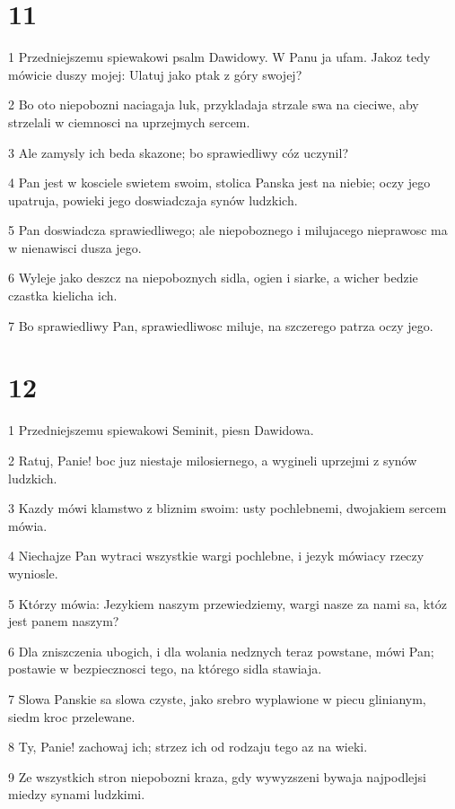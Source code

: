 \chapter{11}

\par 1 Przedniejszemu spiewakowi psalm Dawidowy. W Panu ja ufam. Jakoz tedy mówicie duszy mojej: Ulatuj jako ptak z góry swojej?
\par 2 Bo oto niepobozni naciagaja luk, przykladaja strzale swa na cieciwe, aby strzelali w ciemnosci na uprzejmych sercem.
\par 3 Ale zamysly ich beda skazone; bo sprawiedliwy cóz uczynil?
\par 4 Pan jest w kosciele swietem swoim, stolica Panska jest na niebie; oczy jego upatruja, powieki jego doswiadczaja synów ludzkich.
\par 5 Pan doswiadcza sprawiedliwego; ale niepoboznego i milujacego nieprawosc ma w nienawisci dusza jego.
\par 6 Wyleje jako deszcz na niepoboznych sidla, ogien i siarke, a wicher bedzie czastka kielicha ich.
\par 7 Bo sprawiedliwy Pan, sprawiedliwosc miluje, na szczerego patrza oczy jego.

\chapter{12}

\par 1 Przedniejszemu spiewakowi Seminit, piesn Dawidowa.
\par 2 Ratuj, Panie! boc juz niestaje milosiernego, a wygineli uprzejmi z synów ludzkich.
\par 3 Kazdy mówi klamstwo z bliznim swoim: usty pochlebnemi, dwojakiem sercem mówia.
\par 4 Niechajze Pan wytraci wszystkie wargi pochlebne, i jezyk mówiacy rzeczy wyniosle.
\par 5 Którzy mówia: Jezykiem naszym przewiedziemy, wargi nasze za nami sa, któz jest panem naszym?
\par 6 Dla zniszczenia ubogich, i dla wolania nedznych teraz powstane, mówi Pan; postawie w bezpiecznosci tego, na którego sidla stawiaja.
\par 7 Slowa Panskie sa slowa czyste, jako srebro wyplawione w piecu glinianym, siedm kroc przelewane.
\par 8 Ty, Panie! zachowaj ich; strzez ich od rodzaju tego az na wieki.
\par 9 Ze wszystkich stron niepobozni kraza, gdy wywyzszeni bywaja najpodlejsi miedzy synami ludzkimi.

